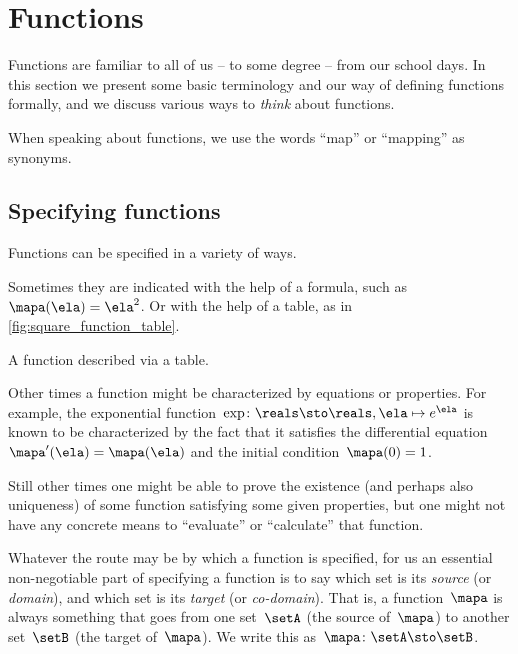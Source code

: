
\section{Functions}
\label{sec:functions}

Functions are familiar to all of us -- to some degree -- from our school days.
In this section we present some basic terminology and our way of defining functions formally, and we discuss various ways to \emph{think} about functions.

When speaking about functions, we use the words ``map'' or ``mapping'' as synonyms.

\subsection{Specifying functions}
\label{sec:domain-codomain}

Functions can be specified in a variety of ways.

Sometimes they are indicated with the help of a formula, such as~$\mapa(\ela)=\ela^2$.
Or with the help of a table, as in \cref{fig:square_function_table}.

\begin{marginfigure}
    \centering
    \caption{A function described via a table.}
    \label{fig:square_function_table}
\end{marginfigure}

Other times a function might be characterized by equations or properties.
For example, the exponential function~$\exp \colon \reals \sto \reals, \ela \mapsto e^\ela$ is known to be characterized by the fact that it satisfies the differential equation~$\mapa'(\ela) = \mapa(\ela)$ and the initial condition~$\mapa(0) =1$.

Still other times one might be able to prove the existence (and perhaps also uniqueness) of some function satisfying some given properties, but one might not have any concrete means to ``evaluate'' or ``calculate'' that function.

Whatever the route may be by which a function is specified, for us an essential non-negotiable part of specifying a function is to say which set is its \emph{source} (or \emph{domain}), and which set is its \emph{target} (or \emph{co-domain}).
That is, a function~$\mapa$ is always something that goes from one set~$\setA$ (the source of~$\mapa$) to another set~$\setB$ (the target of~$\mapa$).
We write this as~$\mapa\colon \setA \sto \setB$.

